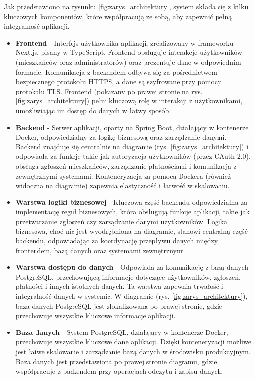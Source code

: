 Jak przedstawiono na rysunku \ref{fig:zarys_architektury}, system składa się z kilku kluczowych komponentów, które współpracują ze sobą, aby zapewnić pełną integralność aplikacji.

\begin{itemize} 

	\item \textbf{Frontend} - Interfejs użytkownika aplikacji, zrealizowany w frameworku Next.js, pisany w TypeScript. Frontend obsługuje interakcje użytkowników (mieszkańców oraz administratorów) oraz prezentuje dane w odpowiednim formacie. Komunikacja z backendem odbywa się za pośrednictwem bezpiecznego protokołu HTTPS, a dane są szyfrowane przy pomocy protokołu TLS. Frontend (pokazany po prawej stronie na rys. \ref{fig:zarys_architektury}) pełni kluczową rolę w interakcji z użytkownikami, umożliwiając im dostęp do danych w łatwy sposób.

	\item \textbf{Backend} - Serwer aplikacji, oparty na Spring Boot, działający w kontenerze Docker, odpowiedzialny za logikę biznesową oraz zarządzanie danymi. Backend znajduje się centralnie na diagramie (rys. \ref{fig:zarys_architektury}) i odpowiada za funkcje takie jak autoryzacja użytkowników (przez OAuth 2.0), obsługa zgłoszeń mieszkańców, zarządzanie płatnościami i komunikacja z zewnętrznymi systemami. Konteneryzacja za pomocą Dockera (również widoczna na diagramie) zapewnia elastyczność i łatwość w skalowaniu.

	\item \textbf{Warstwa logiki biznesowej} - Kluczowa część backendu odpowiedzialna za implementację reguł biznesowych, która obsługują funkcje aplikacji, takie jak przetwarzanie zgłoszeń czy zarządzanie danymi użytkowników. Logika biznesowa, choć nie jest wyodrębniona na diagramie, stanowi centralną część backendu, odpowiadając za koordynację przepływu danych między frontendem, bazą danych oraz systemami zewnętrznymi.

	\item \textbf{Warstwa dostępu do danych} - Odpowiada za komunikację z bazą danych PostgreSQL, przechowującą informacje dotyczące użytkowników, zgłoszeń, płatności i innych istotnych danych. Ta warstwa zapewnia trwałość i integralność danych w systemie. W diagramie (rys. \ref{fig:zarys_architektury}), baza danych PostgreSQL jest zlokalizowana po prawej stronie, gdzie przechowuje wszystkie kluczowe informacje aplikacji.

	\item \textbf{Baza danych} - System PostgreSQL, działający w kontenerze Docker, przechowuje wszystkie kluczowe dane aplikacji. Dzięki konteneryzacji możliwe jest łatwe skalowanie i zarządzanie bazą danych w środowisku produkcyjnym. Baza danych jest przedstawiona po prawej stronie diagramu, gdzie współpracuje z backendem przy operacjach odczytu i zapisu danych.


\end{itemize}
